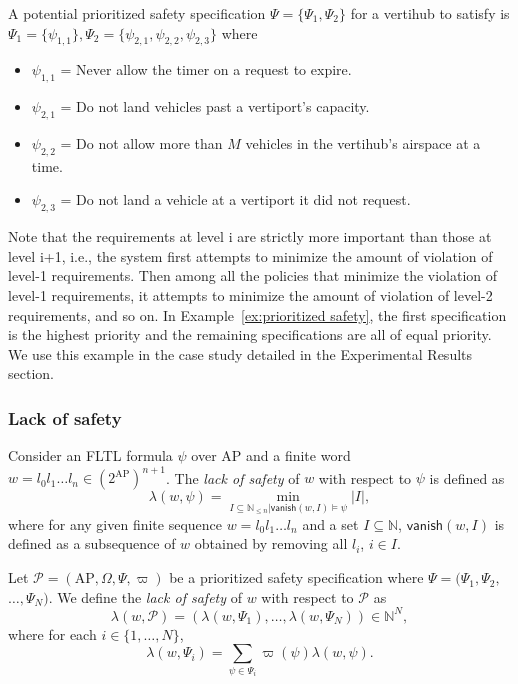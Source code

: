 \begin{eg}\label{ex:prioritized safety}
 A potential prioritized safety specification $\Psi = \{\Psi_1,\Psi_2\}$ for a vertihub to satisfy is $\Psi_1 = \{\psi_{1,1}\}, \Psi_2 = \{\psi_{2,1}, \psi_{2,2}, \psi_{2,3}\}$ where %
\begin{itemize}
    \item $\psi_{1,1}$ = Never allow the timer on a request to expire. 
    \item  $\psi_{2,1}$ = Do not land vehicles past a vertiport's capacity.
    \item  $\psi_{2,2}$ = Do not allow more than $M$ vehicles in the vertihub's airspace at a time.
    \item  $\psi_{2,3}$ = Do not land a vehicle at a vertiport it did not request.
\end{itemize}
\end{eg} 

Note that the requirements at level i are strictly more important than those at level i+1, i.e., the system first attempts to minimize the amount of violation of level-1 requirements. Then among all the policies that minimize the violation of level-1 requirements, it attempts to minimize the amount of violation of level-2 requirements, and so on. In Example~\ref{ex:prioritized safety}, the first specification is the highest priority and the remaining specifications are all of equal priority. We use this example in the case study detailed in the Experimental Results section.

\subsubsection{Lack of safety}
Consider an FLTL formula $\psi$ over $\text{AP}$ and a finite word $w = l_0 l_1 \ldots l_n \in (2^{\text{AP}})^{n+1}$.
The \emph{lack of safety} of $w$ with respect to $\psi$ is defined as
\begin{equation}
        \lambda(w, \psi) = \min_{I \subseteq \mathbb{N}_{\leq n} |
        \mathsf{vanish}(w, I) \models \psi}
        |I|,
\end{equation}
where for any given finite sequence $w = l_0 l_1 \ldots l_n$
and a set $I \subseteq \mathbb{N}$,
$\mathsf{vanish}(w, I)$ is defined as a subsequence of $w$ obtained by
removing all $l_i$, $i \in I$.

Let $\mathcal{P} = (\text{AP}, \Omega, \Psi, \varpi)$ be a prioritized safety specification where $\Psi = (\Psi_1, \Psi_2,$ $\ldots, \Psi_N)$.
We define the \emph{lack of safety} of $w$ with respect to $\mathcal{P}$ as
\begin{equation}
        \lambda(w, \mathcal{P}) = (\lambda(w, \Psi_1), \ldots, \lambda(w, \Psi_N))
        \in \mathbb{N}^{N},
\end{equation}
where for each $i \in \{1, \ldots, N\}$,
\begin{equation}
        \lambda(w, \Psi_i) =
        \sum_{\psi \in \Psi_i} \varpi(\psi) \lambda(w, \psi).
\end{equation}

